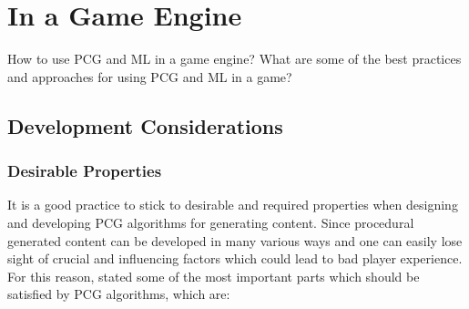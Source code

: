 \documentclass[MGS,Master,english]{twbook}%
\begin{document}
\section{In a Game Engine}
How to use PCG and ML in a game engine? What are some of the best practices and approaches for using PCG and ML in a game?

\subsection{Development Considerations}

\subsubsection{Desirable Properties}
It is a good practice to stick to desirable and required properties when designing and developing PCG algorithms for generating content. Since procedural generated content can be developed in many various ways and one can easily lose sight of crucial and influencing factors which could lead to bad player experience. For this reason, \cite{pcg::book} stated some of the most important parts which should be satisfied by PCG algorithms, which are:
\end{document}
